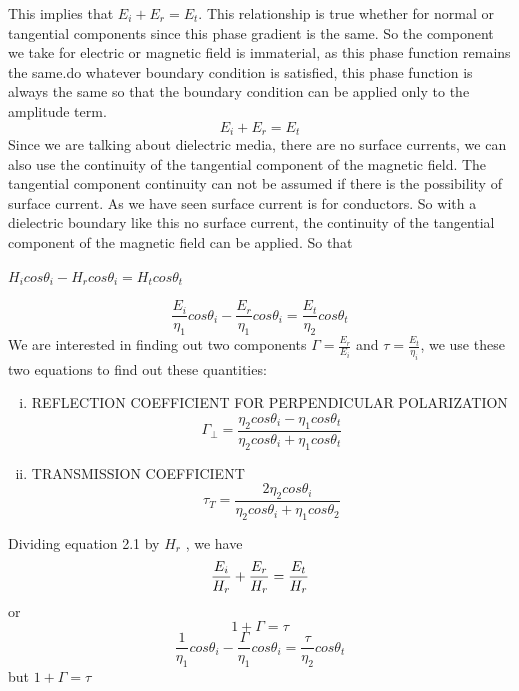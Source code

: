 This implies that $ E_{i} + E_{r} = E_{t}$. This relationship is true whether for normal or tangential components since this phase gradient is the same. So the component we take for electric or magnetic field is immaterial, as this phase function remains the same.do whatever boundary condition is satisfied, this phase function is always the same so that the boundary condition can be applied only to the amplitude term. 
\begin{equation}
E_{i} + E_{r} = E_{t}
\end{equation}
Since we are talking about dielectric media, there are no surface currents, we can also use the continuity of the tangential component of the magnetic field. The tangential component continuity can not be assumed if there is the possibility of surface current. As we have seen surface current is for conductors. So with a dielectric boundary like this no surface current, the continuity of the tangential component of the magnetic field can be applied. So that 
\begin{center}
$H_{i} cos\theta_{i} - H_{r} cos\theta_{i} = H_{t} cos\theta_{t}$
\end{center}
\begin{equation}
\frac{E_{i}}{\eta_{1}} cos\theta_{i} - \frac{E_{r}}{\eta_{1}} cos\theta_{i} = \frac{E_{t}}{\eta_{2}} cos\theta_{t}
\end{equation}
We are interested in finding out two components $\Gamma = \frac{E_{r}}{E_{i}}$ and $ \tau = \frac{E_{t}}{\eta_{i}}$, we use these two equations to find out these quantities:
\begin{enumerate}[(i)]
\item REFLECTION COEFFICIENT FOR PERPENDICULAR POLARIZATION
$$\Gamma_{\bot} = \frac{\eta_{2} cos\theta_{i} - \eta_{1} cos\theta_{t}}{\eta_{2} cos\theta_{i} + \eta_{1} cos\theta_{t}}$$
\item TRANSMISSION COEFFICIENT
$$\tau_{T} = \frac{2 \eta_{2} cos\theta_{i}}{\eta_{2} cos\theta_{i} + \eta_{1} cos\theta_{2}}$$
\end{enumerate}
Dividing equation 2.1 by $H_{r}$ , we have
\begin{equation}
\centering
\frac{E_{i}}{H_{r}} + \frac{E_{r}}{H_{r}} = \frac{E_{t}}{H_{r}}
\end{equation}
or
$$1 + \Gamma = \tau$$
\begin{equation*}
\frac{1}{\eta_{1}}cos\theta_{i} - \frac{\Gamma}{\eta_{1}}cos\theta_{i} = \frac{\tau}{\eta_{2}}cos\theta_{t}
\end{equation*}
but $1 + \Gamma = \tau$
